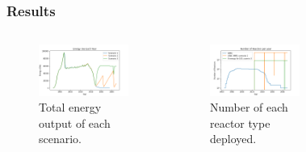 \begin{frame}
\frametitle{Results}
        \vspace{-0.5cm}
    \begin{columns}
      \column[t]{6cm}
      \begin{figure}[t!]
          \includegraphics[trim=0 8 0 10,clip,width=\linewidth]{figures/energy_all.png}
            \vspace*{-0.5cm}
          \caption{Total energy output of each scenario.}
          \label{fig:energy}
      \end{figure}
            \vspace*{-0.25cm}
      \begin{figure}[h]
          \includegraphics[trim=0 8 0 10,clip,width=\linewidth]{figures/rx_deployment_all.png}
            \vspace*{-0.5cm}
          \caption{Number of each reactor type deployed.}
          \label{fig:ex_deployment}
      \end{figure}
      \column[t]{6cm}
  \begin{figure}[t]

\end{figure}
\end{columns}
\end{frame}
